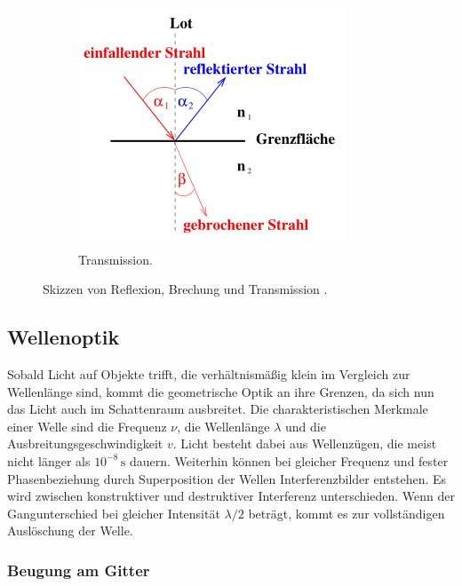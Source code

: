 \begin{figure}
\begin{subfigure}{0.3\textwidth}
        \centering
        \includegraphics{Bilder/Transmission.png}
        \caption{Transmission.}
        \label{fig:Transmission}
    \end{subfigure}
    \caption{Skizzen von Reflexion, Brechung und Transmission \cite{sample}.}
    \label{fig:skizzen}
\end{figure}

\subsection{Wellenoptik}
\label{sec:Wellenoptik}
Sobald Licht auf Objekte trifft, die verhältnismäßig klein im Vergleich zur Wellenlänge sind, kommt die geometrische Optik an ihre
Grenzen, da sich nun das Licht auch im Schattenraum ausbreitet. Die charakteristischen Merkmale einer Welle sind die Frequenz
$\nu$, die Wellenlänge $\lambda$ und die Ausbreitungsgeschwindigkeit $v$. Licht besteht dabei aus Wellenzügen, die meist nicht länger
als $10^{-8}\,\unit{\second}$ dauern. Weiterhin können bei gleicher Frequenz und fester Phasenbeziehung durch Superposition
der Wellen Interferenzbilder entstehen. Es wird zwischen konstruktiver und destruktiver Interferenz unterschieden. Wenn der
Gangunterschied bei gleicher Intensität $\lambda/2$ beträgt, kommt es zur vollständigen Auslöschung der Welle.

\subsubsection{Beugung am Gitter}
\label{sec:Gitter}
